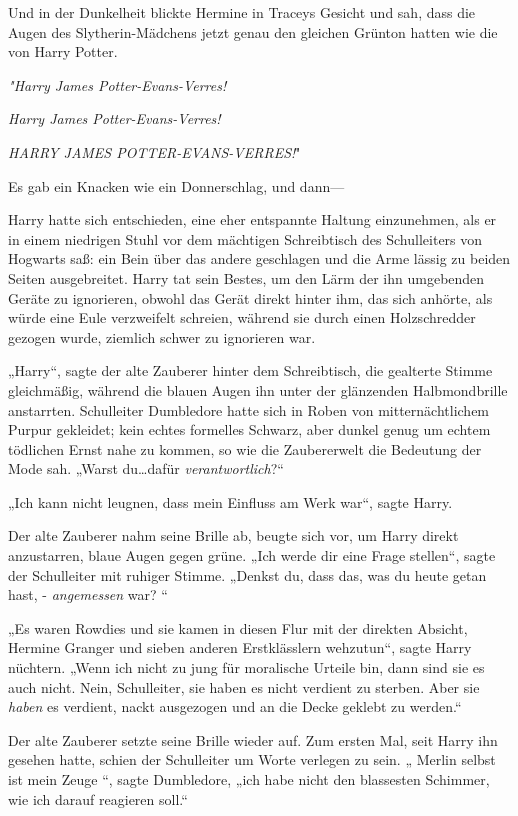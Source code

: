 {Und in der Dunkelheit blickte Hermine in Traceys Gesicht und sah, dass die Augen des Slytherin-Mädchens jetzt genau den gleichen Grünton hatten wie die von Harry Potter.

\emph{"\emph{Harry James Potter-Evans-Verres!}}

\emph{Harry James Potter-Evans-Verres!}

\emph{HARRY JAMES POTTER-EVANS-VERRES!}"

Es gab ein Knacken wie ein Donnerschlag, und dann—

Harry hatte sich entschieden, eine eher entspannte Haltung einzunehmen, als er in einem niedrigen Stuhl vor dem mächtigen Schreibtisch des Schulleiters von Hogwarts saß: ein Bein über das andere geschlagen und die Arme lässig zu beiden Seiten ausgebreitet. Harry tat sein Bestes, um den Lärm der ihn umgebenden Geräte zu ignorieren, obwohl das Gerät direkt hinter ihm, das sich anhörte, als würde eine Eule verzweifelt schreien, während sie durch einen Holzschredder gezogen wurde, ziemlich schwer zu ignorieren war.

„Harry“, sagte der alte Zauberer hinter dem Schreibtisch, die gealterte Stimme gleichmäßig, während die blauen Augen ihn unter der glänzenden Halbmondbrille anstarrten. Schulleiter Dumbledore hatte sich in Roben von mitternächtlichem Purpur gekleidet; kein echtes formelles Schwarz, aber dunkel genug um echtem tödlichen Ernst nahe zu kommen, so wie die Zaubererwelt die Bedeutung der Mode sah. „Warst du…dafür \emph{verantwortlich}?“

„Ich kann nicht leugnen, dass mein Einfluss am Werk war“, sagte Harry.

Der alte Zauberer nahm seine Brille ab, beugte sich vor, um Harry direkt anzustarren, blaue Augen gegen grüne. „Ich werde dir eine Frage stellen“, sagte der Schulleiter mit ruhiger Stimme. „Denkst du, dass das, was du heute getan hast, - \emph{angemessen} war? “

„Es waren Rowdies und sie kamen in diesen Flur mit der direkten Absicht, Hermine Granger und sieben anderen Erstklässlern wehzutun“, sagte Harry nüchtern. „Wenn ich nicht zu jung für moralische Urteile bin, dann sind sie es auch nicht. Nein, Schulleiter, sie haben es nicht verdient zu sterben. Aber sie \emph{haben} es verdient, nackt ausgezogen und an die Decke geklebt zu werden.“

Der alte Zauberer setzte seine Brille wieder auf. Zum ersten Mal, seit Harry ihn gesehen hatte, schien der Schulleiter um Worte verlegen zu sein. „ Merlin selbst ist mein Zeuge “, sagte Dumbledore, „ich habe nicht den blassesten Schimmer, wie ich darauf reagieren soll.“

}
